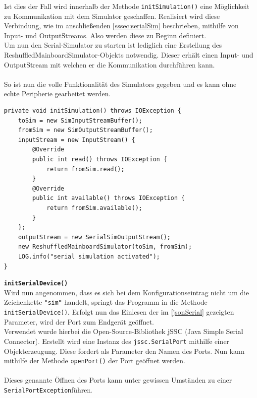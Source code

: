 Ist dies der Fall wird innerhalb der Methode \lstinline{initSimulation()} eine Möglichkeit zu Kommunikation mit dem Simulator geschaffen.
Realisiert wird diese Verbindung, wie im anschließenden \autoref{sssec:serialSim} beschrieben, mithilfe von Input- und OutputStreams.
Also werden diese zu Beginn definiert.\\
Um nun den Serial-Simulator zu starten ist lediglich eine Erstellung des ReshuffledMainboardSimulator-Objekts notwendig.
Dieser erhält einen Input- und OutputStream mit welchen er die Kommunikation durchführen kann.\\\\
So ist nun die volle Funktionalität des Simulators gegeben und es kann ohne echte Peripherie gearbeitet werden.
%
\begin{lstlisting}[style=java,caption=Methode initSimulation(),label=fdsafdsafds]
private void initSimulation() throws IOException {
    toSim = new SimInputStreamBuffer();
    fromSim = new SimOutputStreamBuffer();
    inputStream = new InputStream() {
        @Override
        public int read() throws IOException {
            return fromSim.read();
        }
        @Override
        public int available() throws IOException {
            return fromSim.available();
        }
    };
    outputStream = new SerialSimOutputStream();
    new ReshuffledMainboardSimulator(toSim, fromSim);
    LOG.info("serial simulation activated");
}
\end{lstlisting}
\textbf{\lstinline{initSerialDevice()}}
\\
Wird nun angenommen, dass es sich bei dem Konfigurationseintrag nicht um die Zeichenkette \lstinline[style=json]{"sim"} handelt, springt das Programm in die Methode \lstinline{initSerialDevice()}.
Erfolgt nun das Einlesen der im \autoref{jsonSerial} gezeigten Parameter, wird der Port zum Endgerät geöffnet.\\
Verwendet wurde hierbei die Open-Source-Bibliothek \acs{jSSC} (Java Simple Serial Connector).
Erstellt wird eine Instanz des \lstinline[style=java]{jssc.SerialPort} mithilfe einer Objekterzeugung.
Diese fordert als Parameter den Namen des Ports.
Nun kann mithilfe der Methode \lstinline{openPort()} der Port geöffnet werden.\\\\
Dieses genannte Öffnen des Ports kann unter gewissen Umständen zu einer \lstinline[style=java]{SerialPortException}führen.
